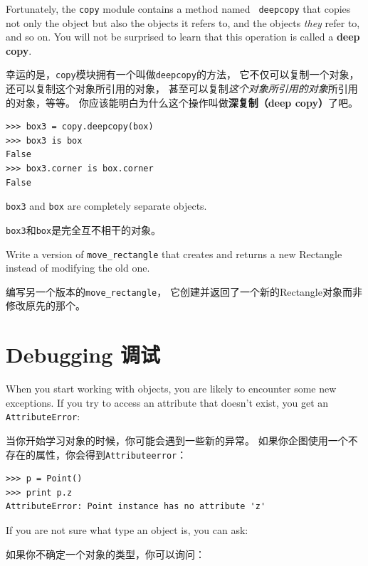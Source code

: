 \documentclass[10pt]{book}
\begin{document}
\begin{CJK}{UTF8}{gbsn}
Fortunately, the {\tt copy} module contains a method named {\tt
deepcopy} that copies not only the object but also 
the objects it refers to, and the objects {\em they} refer to,
and so on.
You will not be surprised to learn that this operation is
called a {\bf deep copy}.

幸运的是，{\tt copy}模块拥有一个叫做{\tt deepcopy}的方法，
它不仅可以复制一个对象，还可以复制这个对象所引用的对象，
甚至可以复制{\em 这个对象所引用的对象}所引用的对象，等等。
你应该能明白为什么这个操作叫做{\bf 深复制（deep copy）}了吧。

\begin{verbatim}
>>> box3 = copy.deepcopy(box)
>>> box3 is box
False
>>> box3.corner is box.corner
False
\end{verbatim}
%
{\tt box3} and {\tt box} are completely separate objects.

{\tt box3}和{\tt box}是完全互不相干的对象。

\begin{exercise}

Write a version of \verb"move_rectangle" that creates and
returns a new Rectangle instead of modifying the old one.

编写另一个版本的\verb"move_rectangle"，
它创建并返回了一个新的Rectangle对象而非修改原先的那个。

\end{exercise}


\section{Debugging 调试}
\label{hasattr}

When you start working with objects, you are likely to encounter
some new exceptions.  If you try to access an attribute
that doesn't exist, you get an {\tt AttributeError}:

当你开始学习对象的时候，你可能会遇到一些新的异常。
如果你企图使用一个不存在的属性，你会得到{\tt Attributeerror}：

\begin{verbatim}
>>> p = Point()
>>> print p.z
AttributeError: Point instance has no attribute 'z'
\end{verbatim}
%
If you are not sure what type an object is, you can ask:

如果你不确定一个对象的类型，你可以询问：


\end{CJK}
\end{document}
